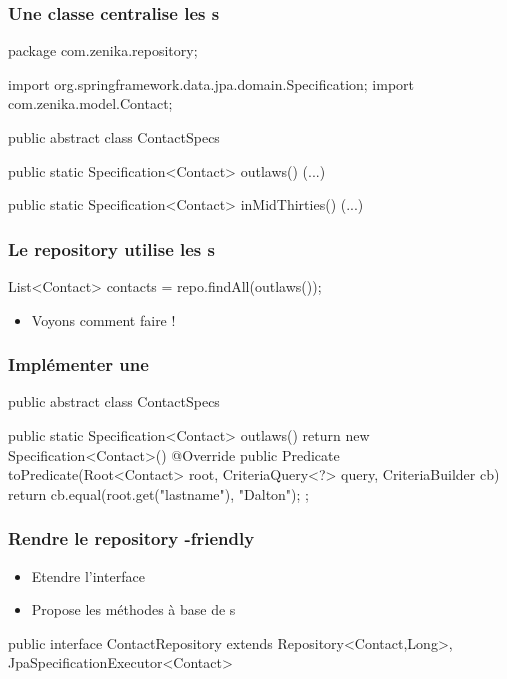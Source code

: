 \begin{frame}[fragile]
 \frametitle{Une classe centralise les s}

 \begin{javacode}
package com.zenika.repository;

import org.springframework.data.jpa.domain.Specification;
import com.zenika.model.Contact;

public abstract class ContactSpecs {

  public static Specification<Contact> outlaws() {
    (...)
  }
  
  public static Specification<Contact> inMidThirties() {
    (...)
  }
  
}
 \end{javacode}
\end{frame}

\begin{frame}[fragile]
 \frametitle{Le repository utilise les s}

 \begin{javacode}
List<Contact> contacts = repo.findAll(outlaws());
 \end{javacode}
 
 \begin{itemize}
  \item Voyons comment faire !
 \end{itemize}

\end{frame}

\begin{frame}[fragile]
 \frametitle{Implémenter une }

 \begin{javacode}
public abstract class ContactSpecs {

  public static Specification<Contact> outlaws() {
    return new Specification<Contact>() {
      @Override
      public Predicate toPredicate(Root<Contact> root,
               CriteriaQuery<?> query, CriteriaBuilder cb) {
        return cb.equal(root.get("lastname"), "Dalton");
      }
    };
  }
}
 \end{javacode}

\end{frame}

\begin{frame}[fragile]
 \frametitle{Rendre le repository -friendly}

 \begin{itemize}
  \item Etendre l'interface 
  \item Propose les méthodes à base de s
 \end{itemize}

 \begin{javacode}
public interface ContactRepository 
	    extends Repository<Contact,Long>,
	    JpaSpecificationExecutor<Contact> {


}
 \end{javacode}

\end{frame}


